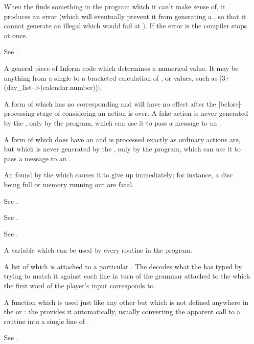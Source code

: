 {{{%
When the  finds something in the program which it can't make sense
of, it produces an error (which will eventually prevent it from generating a
, so that it cannot generate an illegal  which
would fail at ).  If the error is  the compiler stops
at once.

%
See .

%
A general piece of Inform code which determines a numerical value.  It may
be anything from a single  to a bracketed calculation of
,  or  values, such as
|3+(day_list-->(calendar.number))|.

%
A form of  which has no corresponding  and will
have no effect after the |before|-processing stage of considering an action
is over.  A fake action is never generated by the , only by
the program, which can use it to pass a message to an .

%
A form of  which does have an  and is processed
exactly as ordinary actions are, but which is never generated by the
, only by the program, which can use it to pass a message to an
.

%
An  found by the  which causes it to give up immediately;
for instance, a disc being full or memory running out are fatal.

%
See .

%
See .

%
See .

%
A variable which can be used by every routine in the program.

%
A list of  which is attached to a particular .  The 
decodes what the  has typed by trying to match it against each line
in turn of the grammar attached to the  which the first word of the
player's input corresponds to.

%
A function which is used just like any other  but which is
not defined anywhere in the  or : the 
provides it automatically, usually converting the apparent call to a
routine into a single line of .

%
See .

}}}
